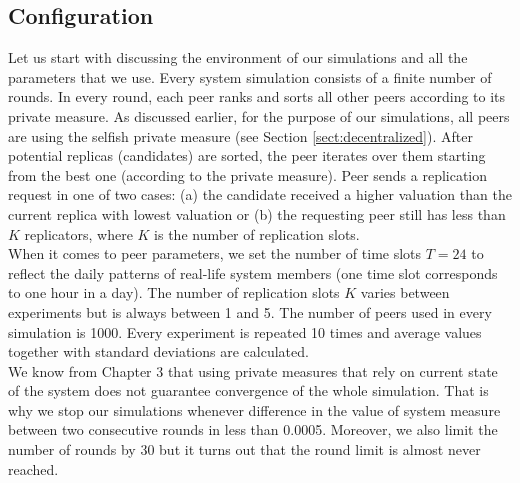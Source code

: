 \documentclass{pracamgren}
\begin{document}
\subsection{Configuration}\label{sect:configuration}

Let us start with discussing the environment of our simulations and all the parameters that we use. Every system simulation consists of a finite number of rounds. In every round, each peer ranks and sorts all other peers according to its private measure. As discussed earlier, for the purpose of our simulations, all peers are using the selfish private measure (see Section \ref{sect:decentralized}). After potential replicas (candidates) are sorted, the peer iterates over them starting from the best one (according to the private measure). Peer sends a replication request in one of two cases: (a) the candidate received a higher valuation than the current replica with lowest valuation or (b) the requesting peer still has less than $K$ replicators, where $K$ is the number of replication slots.\\

When it comes to peer parameters, we set the number of time slots $T=24$ to reflect the daily patterns of real-life system members (one time slot corresponds to one hour in a day). The number of replication slots $K$ varies between experiments but is always between 1 and 5. The number of peers used in every simulation is 1000. Every experiment is repeated 10 times and average values together with standard deviations are calculated.\\

We know from Chapter 3 that using private measures that rely on current state of the system does not guarantee convergence of the whole simulation. That is why we stop our simulations whenever difference in the value of system measure between two consecutive rounds in less than 0.0005. Moreover, we also limit the number of rounds by 30 but it turns out that the round limit is almost never reached.\\
\end{document}
